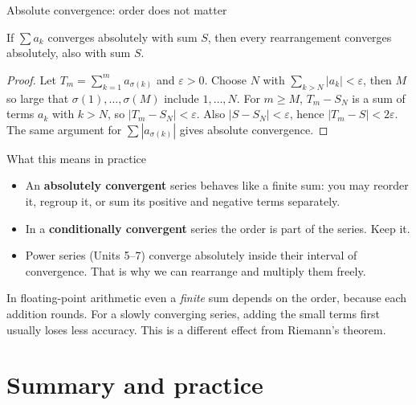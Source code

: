 \documentclass[10pt]{wosm-slides}
\begin{document}
\begin{frame}{Absolute convergence: order does not matter}
  \begin{theorem}
    If $\sum a_k$ converges absolutely with sum $S$, then every rearrangement converges
    absolutely, also with sum $S$.
  \end{theorem}
  \pause
  \begin{proof}
    Let $T_m = \sum_{k=1}^m a_{\sigma(k)}$ and $\varepsilon > 0$. Choose $N$ with
    $\sum_{k > N} |a_k| < \varepsilon$, then $M$ so large that
    $\sigma(1), \dots, \sigma(M)$ include $1, \dots, N$.
    For $m \ge M$, $T_m - S_N$ is a sum of terms $a_k$ with $k > N$, so
    $|T_m - S_N| < \varepsilon$. Also $|S - S_N| < \varepsilon$, hence $|T_m - S| < 2\varepsilon$.
    The same argument for $\sum |a_{\sigma(k)}|$ gives absolute convergence.
  \end{proof}
\end{frame}

\begin{frame}{What this means in practice}
  \begin{itemize}
    \item An \textbf{absolutely convergent} series behaves like a finite sum: you may
      reorder it, regroup it, or sum its positive and negative terms separately.
    \item In a \textbf{conditionally convergent} series the order is part of the series.
      Keep it.
    \item Power series (Units 5--7) converge absolutely inside their interval of convergence.
      That is why we can rearrange and multiply them freely.
  \end{itemize}
  \pause
  \begin{remark}[On a computer]
    In floating-point arithmetic even a \emph{finite} sum depends on the order, because each
    addition rounds. For a slowly converging series, adding the small terms first usually
    loses less accuracy. This is a different effect from Riemann's theorem.
  \end{remark}
\end{frame}

\section{Summary and practice}
\end{document}
